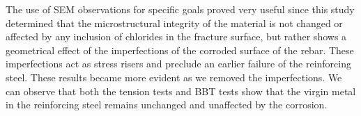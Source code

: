 The use of SEM observations for specific goals proved very useful since this study determined that the microstructural integrity of the material is not changed or affected by any inclusion of chlorides in the fracture surface, but rather shows a geometrical effect of the imperfections of the corroded surface of the rebar. These imperfections act as stress risers and preclude an earlier failure of the reinforcing steel. These results became more evident as we removed the imperfections. We can observe that both the tension tests and BBT tests show that the virgin metal in the reinforcing steel remains unchanged and unaffected by the corrosion.



